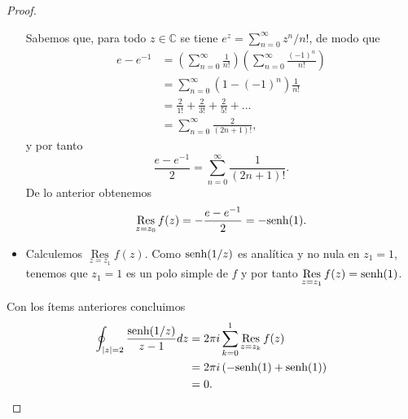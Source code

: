 \begin{proof}
\begin{itemize}
$$        $$
        Sabemos que, para todo $z\in\mathbb{C}$ se tiene $e^z=\sum_{n=0}^{\infty}z^n/n!$, de modo que
        $$
        \begin{aligned}
           e-e^{-1}&=\left( \sum_{n=0}^{\infty}\frac{1}{n!}\right)\left( \sum_{n=0}^{\infty}\frac{(-1)^n}{n!}\right)\\
                   &=\sum_{n=0}^{\infty}\left( 1-(-1)^n\right)\frac{1}{n!}\\
                   &=\frac{2}{1!}+\frac{2}{3!}+\frac{2}{5!}+\dots\\
                   &=\sum_{n=0}^{\infty}\frac{2}{(2n+1)!},
        \end{aligned}
        $$
        y por tanto
        $$
        \frac{e-e^{-1}}{2}=\sum_{n=0}^{\infty}\frac{1}{(2n+1)!}.
        $$
        De lo anterior obtenemos
        $$
        \mathop{\mathrm{Res}}\limits_{z=z_0}f(z)=-\frac{e-e^{-1}}{2}=-\normalfont{\text{senh}} (1).
        $$
     \item Calculemos $\mathop{\mathrm{Res}}\limits_{z=z_1}f(z)$. Como $\normalfont{\text{senh}} (1/z)$ es analítica y no nula en $z_1=1$, tenemos que $z_1=1$ es un polo simple de $f$ y por tanto $\mathop{\mathrm{Res}}\limits_{z=z_1}f(z)=\normalfont{\text{senh}} (1)$.
  \end{itemize}
  Con los ítems anteriores concluimos
  $$
  \begin{aligned}
     \oint _{|z|=2}\frac{\normalfont{\text{senh}} (1/z)}{z-1}dz&=2\pi i \sum_{k=0}^{1}\mathop{\mathrm{Res}}\limits_{z=z_k}f(z)\\
                                            &=2\pi i\left( -\normalfont{\text{senh}}(1)+\normalfont{\text{senh}}(1)\right)\\
                                            &=0.
  \end{aligned}
  $$
\end{proof}
